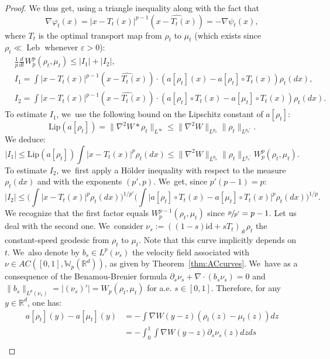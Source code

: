 \documentclass[11pt]{article}
\numberwithin{equation}{section}
\DeclareMathOperator{\Leb}{Leb}
\def\RR{\mathbb{R}}
\def\WW{\mathbb{W}}
\def\eps{\varepsilon}
\def\pa{\partial}
\def\lip{\mathrm{Lip}}
\theoremstyle{plain}
\theoremstyle{definition}
\begin{document}
\begin{proof}
We thus get, using a triangle inequality along with the fact that
\[
\nabla \varphi_t(x) = |x - T_t(x)|^{p-1} (\widehat{x - T_t(x)}) = - \nabla \psi_t(x),
\]
where $T_t$ is the optimal transport map from $\rho_t$ to $\mu_t$ (which exists since $\rho_t \ll \Leb$ whenever $\eps>0$):
\begin{subequations}\label{eq:I12}
\begin{align}
	& \frac 1p \frac{d}{dt} W_p^p(\rho_t, \mu_t) \leq |I_1| + |I_2|, \\
& I_1 = \int |x - T_t(x)|^{p-1} (\widehat{x - T_t(x)}) \cdot (a[\rho_t](x) - a[\rho_t] \circ T_t(x)) \rho_t(dx), \label{eq:I1} \\
& I_2 = \int |x - T_t(x)|^{p-1} (\widehat{x - T_t(x)}) \cdot (a[\rho_t] \circ T_t(x) - a[\mu_t] \circ T_t(x)) \rho_t(dx). \label{eq:I2}
\end{align}
\end{subequations}
To estimate $I_1$, we~use the following bound on the Lipschitz constant of $a[\rho_t]$:
\[
\lip (a[\rho_t]) = \|\nabla^2 W * \rho_t\|_{L^\infty} \leq \|\nabla^2 W\|_{L^{p_0}} \|\rho_t\|_{L^{p_0'}}.
\]
We deduce:
\[
|I_1| \leq \lip (a[\rho_t]) \int |x - T_t(x)|^p \rho_t(dx) \leq \|\nabla^2 W\|_{L^{p_0}} \|\rho_t\|_{L^{p_0'}} W_p^p(\rho_t, \mu_t).
\]
To estimate $I_2$, we~first apply a Hölder inequality with respect to the measure $\rho_t(dx)$ and with the exponents $(p',p)$. We~get, since $p'(p-1)=p$:
\begin{equation}\label{ineq:I2}
|I_2| \leq \bigg( \int |x - T_t(x)|^p \rho_t(dx) \bigg)^{1/p'} \bigg( \int \big|a[\rho_t] \circ T_t(x) - a[\mu_t] \circ T_t(x) \big|^p \rho_t(dx)\bigg)^{1/p}.
\end{equation}
We recognize that the first factor equals $W_p^{p-1}(\rho_t, \mu_t)$ since $\sfrac{p}{p'} = p-1$.
Let us deal with the second one. We~consider $\nu_s := \left((1-s)\text{id} + sT_t\right)_\#\rho_t$ the constant-speed geodesic from $\rho_t$ to $\mu_t$. Note that this curve implicitly depends on $t$. We~also denote by $b_s \in L^p(\nu_s)$ the velocity field associated with $\nu \in AC([0,1], \WW_p(\RR^d))$, as given by Theorem~\ref{thm:ACcurves}. We~have as a consequence of the Benamou-Brenier formula $\pa_s \nu_s + \nabla \cdot(b_s\nu_s) = 0$ and $\|b_s\|_{L^p(\nu_s)} = |(\nu_s)'| = W_p(\rho_t, \mu_t)$ for a.e. $s \in [0,1]$. Therefore, for any $y \in \RR^d$, one has:
\begin{align*}
a[\rho_t](y) - a[\mu_t](y) & = - \int \nabla W(y-z) (\rho_t(z) - \mu_t(z)) dz \\
& = - \int_0^1 \int \nabla W(y-z) \pa_s \nu_s(z) dz ds \\

\end{align*}
\end{proof}
\end{document}

